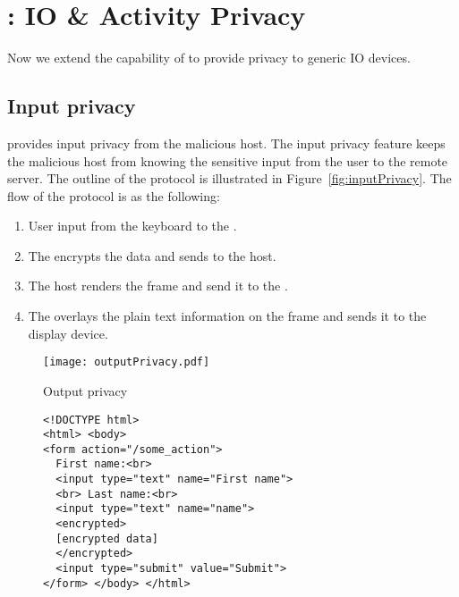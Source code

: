 \section{\name: IO \& Activity Privacy}
\label{sec:IOPrivacy}

Now we extend the capability of \name to provide privacy to generic IO devices.

\subsection{Input privacy}
\label{sec:systemDesign:inputPrivacy}

\name provides input privacy from the malicious host. The input privacy feature keeps the malicious host from knowing the sensitive input from the user to the remote server. The outline of the protocol is illustrated in Figure~\ref{fig:inputPrivacy}. The flow of the protocol is as the following:

\begin{enumerate}
  \item[\one] User input from the keyboard to the \device.
  \item[\two] The \device encrypts the data and sends to the host.
  \item[\three] The host renders the frame and send it to the \device.
  \item[\four] The \device overlays the plain text information on the frame and sends it to the display device.
\end{enumerate}


\begin{figure}[h]
\centering
\texttt{[image: outputPrivacy.pdf]}
\caption{Output privacy}
\label{fig:outputPrivacy}
\centering
\end{figure}

\iffalse
{}
\begin{figure}[t]
\small
\begin{lstlisting}[mathescape=true]
<!DOCTYPE html>
<html> <body>
<form action="/some_action">
  First name:<br>
  <input type="text" name="First name">
  <br> Last name:<br>
  <input type="text" name="name">
  <encrypted>
  [encrypted data]
  </encrypted>
  <input type="submit" value="Submit">
</form> </body> </html>
\end{lstlisting} 
\end{figure}


